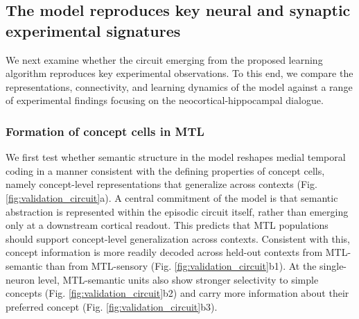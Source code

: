 \documentclass{article}
\providecommand{\DIFdelbegin}{} %
\providecommand{\DIFdelend}{} %
\begin{document}
\subsection*{The model reproduces key neural and synaptic experimental signatures}
\DIFdelbegin %

\DIFdelend We next examine whether the circuit emerging from the proposed learning algorithm reproduces key experimental observations. To this end, we compare the representations, connectivity, and learning dynamics of the model against a range of experimental findings focusing on the neocortical-hippocampal dialogue.
\subsubsection*{Formation of concept cells in MTL}
We first test whether semantic structure in the model reshapes medial temporal coding in a manner consistent with the defining properties of concept cells, namely concept-level representations that generalize across contexts (Fig. \ref{fig:validation_circuit}a). A central commitment of the model is that semantic abstraction is represented within the episodic circuit itself, rather than emerging only at a downstream cortical readout. This predicts that MTL populations should support concept-level generalization across contexts. Consistent with this, concept information is more readily decoded across held-out contexts from MTL-semantic than from MTL-sensory (Fig. \ref{fig:validation_circuit}b1). At the single-neuron level, MTL-semantic units also show stronger selectivity to simple concepts (Fig. \ref{fig:validation_circuit}b2) and carry more information about their preferred concept (Fig. \ref{fig:validation_circuit}b3).
\end{document}
